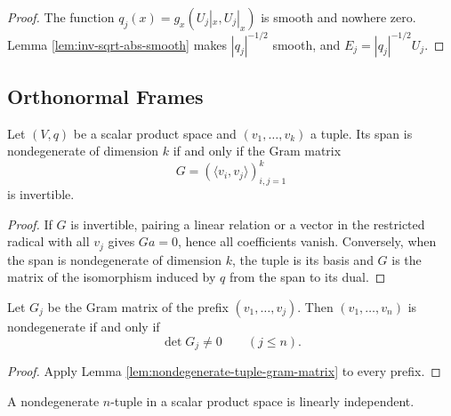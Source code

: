 \begin{proof}
\leanok
{}
\sketch The function $q_j(x)=g_x(U_j|_x,U_j|_x)$ is smooth and nowhere zero.
Lemma \ref{lem:inv-sqrt-abs-smooth} makes $|q_j|^{-1/2}$ smooth, and
$E_j=|q_j|^{-1/2}U_j$.
\end{proof}

\subsection{Orthonormal Frames}

\begin{lemma}
\label{lem:nondegenerate-tuple-gram-matrix}
\leanok
{}
Let $(V,q)$ be a scalar product space and $(v_1,\ldots,v_k)$ a tuple. Its span
is nondegenerate of dimension $k$ if and only if the Gram matrix
\[
G=(\langle v_i,v_j\rangle)_{i,j=1}^k
\]
is invertible.
\end{lemma}

\begin{proof}
\leanok
{}
\sketch If $G$ is invertible, pairing a linear relation or a vector in the
restricted radical with all $v_j$ gives $Ga=0$, hence all coefficients vanish.
Conversely, when the span is nondegenerate of dimension $k$, the tuple is its
basis and $G$ is the matrix of the isomorphism induced by $q$ from the span to
its dual.
\end{proof}

\begin{lemma}
\label{lem:nondegenerate-tuple-leading-minors}
\leanok
{}
Let $G_j$ be the Gram matrix of the prefix $(v_1,\ldots,v_j)$. Then
$(v_1,\ldots,v_n)$ is nondegenerate if and only if
\[
\det G_j\ne0\qquad(j\leq n).
\]
\end{lemma}

\begin{proof}
\leanok
{}
\sketch Apply Lemma \ref{lem:nondegenerate-tuple-gram-matrix} to every prefix.
\end{proof}

\begin{lemma}
\label{lem:nondegenerate-tuple-independent}
\leanok
A nondegenerate $n$-tuple in a scalar product space is linearly independent.
\end{lemma}

